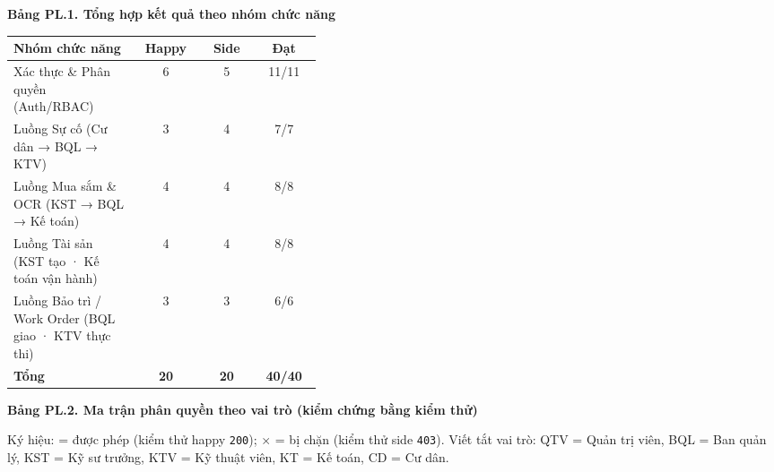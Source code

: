 \medskip
\textbf{Bảng PL.1. Tổng hợp kết quả theo nhóm chức năng}

\begin{center}{\small\renewcommand{\arraystretch}{1.2}
\begin{tabular}{|>{\raggedright\arraybackslash}p{0.40\linewidth}|c|c|c|}
\hline
\rowcolor{gray!15}\textbf{Nhóm chức năng} & \textbf{Happy} & \textbf{Side} & \textbf{Đạt} \\ \hline
Xác thực \& Phân quyền (Auth/RBAC) & 6 & 5 & 11/11 \\ \hline
Luồng Sự cố (Cư dân → BQL → KTV) & 3 & 4 & 7/7 \\ \hline
Luồng Mua sắm \& OCR (KST → BQL → Kế toán) & 4 & 4 & 8/8 \\ \hline
Luồng Tài sản (KST tạo · Kế toán vận hành) & 4 & 4 & 8/8 \\ \hline
Luồng Bảo trì / Work Order (BQL giao · KTV thực thi) & 3 & 3 & 6/6 \\ \hline
\rowcolor{gray!15}\textbf{Tổng} & \textbf{20} & \textbf{20} & \textbf{40/40} \\ \hline
\end{tabular}}\end{center}

\medskip
\textbf{Bảng PL.2. Ma trận phân quyền theo vai trò (kiểm chứng bằng kiểm thử)}

\noindent Ký hiệu: \checkmark{} = được phép (kiểm thử happy \texttt{200}); $\times$ = bị chặn (kiểm thử side \texttt{403}). Viết tắt vai trò: QTV = Quản trị viên, BQL = Ban quản lý, KST = Kỹ sư trưởng, KTV = Kỹ thuật viên, KT = Kế toán, CD = Cư dân.

